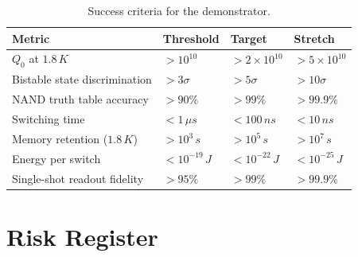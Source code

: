 \documentclass[12pt,a4paper]{article}
\begin{document}
\begin{table}[H]
\centering
\caption{Success criteria for the demonstrator.}
\begin{tabular}{llll}
\toprule
\textbf{Metric} & \textbf{Threshold} & \textbf{Target} & \textbf{Stretch} \\
\midrule
$Q_0$ at $1.8\,\si{K}$ & $> 10^{10}$ & $> 2\times 10^{10}$ & $> 5\times 10^{10}$ \\
Bistable state discrimination & $> 3\sigma$ & $> 5\sigma$ & $> 10\sigma$ \\
NAND truth table accuracy & $> 90\%$ & $> 99\%$ & $> 99.9\%$ \\
Switching time & $< 1\,\si{\mu s}$ & $< 100\,\si{ns}$ & $< 10\,\si{ns}$ \\
Memory retention ($1.8\,\si{K}$) & $> 10^3\,\si{s}$ & $> 10^5\,\si{s}$ & $> 10^7\,\si{s}$ \\
Energy per switch & $< 10^{-19}\,\si{J}$ & $< 10^{-22}\,\si{J}$ & $< 10^{-25}\,\si{J}$ \\
Single-shot readout fidelity & $> 95\%$ & $> 99\%$ & $> 99.9\%$ \\
\bottomrule
\end{tabular}
\end{table}

\section{Risk Register}
\end{document}
